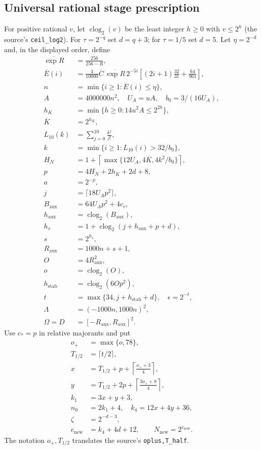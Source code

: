 \documentclass[11pt]{article}
\theoremstyle{plain}
\theoremstyle{definition}
\theoremstyle{remark}
\begin{document}
\subsection{Universal rational stage prescription}
For positive rational $v$, let $\operatorname{clog}_2(v)$ be the least
integer $h\ge0$ with $v\le2^h$ (the source's \texttt{ceil\_log2}).
For $\tau=2^{-q}$ set $d=q+3$; for $\tau=1/5$ set $d=5$.
Let $\eta=2^{-d}$ and, in the displayed order, define
\begin{align*}
 \overline{\exp R}&=\frac{256}{256-R},\\
 \overline E(i)&=\frac4{10000}\overline C\,\overline{\exp R}\,2^{-5i}
              \left[(2i+1)\frac{32}{31}+\frac{64}{961}\right],\\
 n&=\min\{i\ge1:\overline E(i)\le\eta\},\\
 A&=4000000n^2,\quad U_A=uA,\quad b_0=3/(16U_A),\\
 h_K&=\min\{h\ge0:14u^2 A\le2^{2h}\},\\
 \overline K&=2^{h_K},\\
 L_{10}(k)&=\sum_{j=0}^{10}\frac{k^j}{j!},\\
 k&=\min\{i\ge1:L_{10}(i)>32/b_0\},\\
 H_N&=1+\left\lceil\max\{12U_A,4\overline K,4k^2/b_0\}\right\rceil,\\
 p&=4H_N+2h_K+2d+8,\\
 a&=2^{-p},\\
 j&=\lceil18U_Ap^2\rceil,\\
 B_{\mathrm{aux}}&=64U_Ap^2+4c_r,\\
 h_{\mathrm{aux}}&=\operatorname{clog}_2(B_{\mathrm{aux}}),\\
 h_s&=1+\operatorname{clog}_2(j+h_{\mathrm{aux}}+p+d),\\
 s&=2^{h_s},\\
 R_{\mathrm{aux}}&=1000n+s+1,\\
 O&=4R_{\mathrm{aux}}^2,\\
 o&=\operatorname{clog}_2(O),\\
 h_{\mathrm{stab}}&=\operatorname{clog}_2(6Op^2),\\
 t&=\max\{34,j+h_{\mathrm{stab}}+d\},\quad\epsilon=2^{-t},\\
 \Lambda&=(-1000n,1000n)^2,\\
 \Omega=D&=[-R_{\mathrm{aux}},R_{\mathrm{aux}}]^2.
\end{align*}
Use $c_*=p$ in relative majorants and put
\begin{align*}
 o_+&=\max\{o,78\},\\
 T_{1/2}&=\lceil t/2\rceil,\\
 x&=T_{1/2}+p+\left\lceil\frac{o_++3}{4}\right\rceil,\\
 y&=T_{1/2}+2p+\left\lceil\frac{3o_++8}{4}\right\rceil,\\
 k_1&=3x+y+3,\\
 n_0&=2k_1+4,\quad k_4=12x+4y+36,\\
 \zeta&=2^{-d-3},\\
 e_{\mathrm{new}}&=k_4+4d+12,
 \qquad N_{\mathrm{new}}=2^{e_{\mathrm{new}}}.
\end{align*}
The notation $o_+,T_{1/2}$ translates the source's \texttt{oplus,T\_half}.
\end{document}
